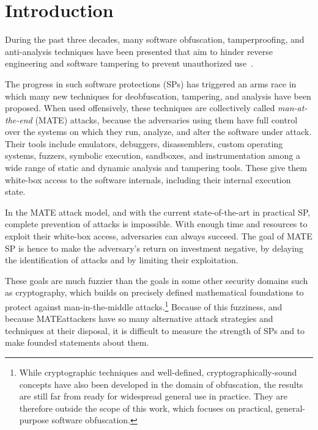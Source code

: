 \section{Introduction}
\label{sec:introduction}

During the past three decades, many software obfuscation, tamperproofing, and anti-analysis techniques have been presented that aim to hinder reverse engineering and software tampering to prevent unauthorized use~\cite{collbergbook,survey2016,desutter2024evaluation}.

The progress in such software protections (SPs) has triggered an arms race in which many new techniques for deobfuscation, tampering, and analysis have been proposed. When used offensively, these techniques are collectively called \emph{man-at-the-end} (MATE) attacks, because the adversaries using them have full control over the systems on which they run, analyze, and alter the software under attack. Their tools include emulators, debuggers, disassemblers, custom operating systems, fuzzers, symbolic execution, sandboxes, and instrumentation among a wide range of static and dynamic analysis and tampering tools.
These give them white-box access to the software internals, including their internal execution state.

In the MATE attack model, and with the current state-of-the-art in practical SP, complete prevention of attacks is impossible. With enough time and resources to exploit their white-box access, adversaries can always succeed. The goal of MATE SP is hence to make the adversary's return on investment negative, by delaying the identification of attacks and by limiting their exploitation.

These goals are much fuzzier than the goals in some other security domains such as cryptography, which builds on precisely defined mathematical foundations to protect against man-in-the-middle attacks.\footnote{While cryptographic techniques and well-defined, cryptographically-sound concepts have also been developed in the domain of obfuscation, the results are still far from ready for widespread general use in practice. They are therefore outside the scope of this work, which focuses on practical, general-purpose software obfuscation.} Because of this fuzziness, and because MATE\linebreak attackers have so many alternative attack strategies and techniques at their disposal, it is difficult to measure the strength of SPs and to make founded statements about them.

